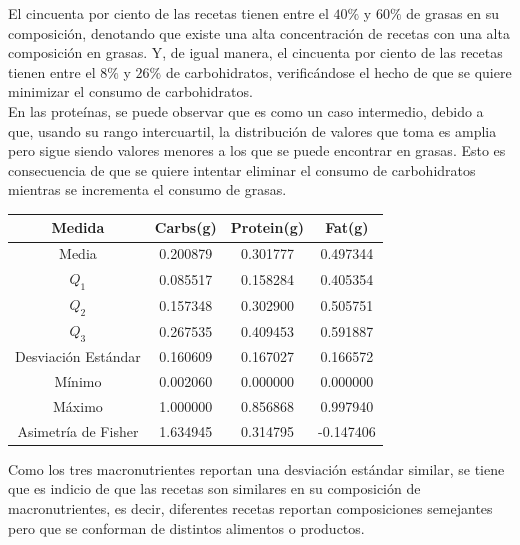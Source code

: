 \documentclass[12pt,a4paper]{article}
\begin{document}
            El cincuenta por ciento de las recetas tienen entre el $40\%$ y 
            $60\%$ de grasas en su composición, denotando que existe una alta 
            concentración de recetas con una alta composición en grasas. Y, de 
            igual manera, el cincuenta por ciento de las recetas tienen entre 
            el $8\%$ y $26\%$ de carbohidratos, verificándose el hecho de que 
            se quiere minimizar el consumo de carbohidratos.\\

            En las proteínas, se puede observar que es como un caso intermedio, 
            debido a que, usando su rango intercuartil, la distribución de valores 
            que toma es amplia pero sigue siendo valores menores a los que se puede 
            encontrar en grasas. Esto es consecuencia de que se quiere intentar 
            eliminar el consumo de carbohidratos mientras se incrementa el consumo 
            de grasas.

            \begin{center}
                \begin{tabular}{| c | c c c |}
                    \toprule
                    Medida & Carbs(g) & Protein(g) & Fat(g) \\
                    \midrule
                    Media               & 0.200879 & 0.301777 & 0.497344  \\
                    $Q_1$               & 0.085517 & 0.158284 & 0.405354  \\
                    $Q_2$               & 0.157348 & 0.302900 & 0.505751  \\
                    $Q_3$               & 0.267535 & 0.409453 & 0.591887  \\
                    Desviación Estándar & 0.160609 & 0.167027 & 0.166572  \\
                    Mínimo              & 0.002060 & 0.000000 & 0.000000  \\
                    Máximo              & 1.000000 & 0.856868 & 0.997940  \\
                    Asimetría de Fisher & 1.634945 & 0.314795 & -0.147406 \\
                    \bottomrule
                \end{tabular}
            \end{center}

            Como los tres macronutrientes reportan una desviación estándar similar, 
            se tiene que es indicio de que las recetas son similares en su composición 
            de macronutrientes, es decir, diferentes recetas reportan composiciones 
            semejantes pero que se conforman de distintos alimentos o productos.\\
\end{document}
